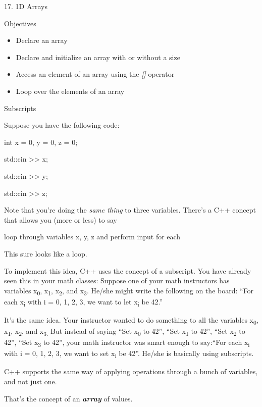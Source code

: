 \documentclass[
]{article}
\author{}
\date{}
\providecommand{\tightlist}{%
  \setlength{\itemsep}{0pt}\setlength{\parskip}{0pt}}
\begin{document}
17. 1D Arrays

Objectives

\begin{itemize}
\tightlist
\item
  Declare an array
\item
  Declare and initialize an array with or without a size
\item
  Access an element of an array using the \emph{{[}{]}} operator
\item
  Loop over the elements of an array
\end{itemize}

Subscripts

Suppose you have the following code:

int x = 0, y = 0, z = 0;

std::cin \textgreater\textgreater{} x;

std::cin \textgreater\textgreater{} y;

std::cin \textgreater\textgreater{} z;

Note that you're doing the \emph{same thing} to three variables. There's
a C++ concept that allows you (more or less) to say

loop through variables x, y, z and perform input for each

This sure looks like a loop.

To implement this idea, C++ uses the concept of a subscript. You have
already seen this in your math classes: Suppose one of your math
instructors has variables x\textsubscript{0}, x\textsubscript{1},
x\textsubscript{2}, and x\textsubscript{3}. He/she might write the
following on the board: ``For each x\textsubscript{i} with i = 0, 1, 2,
3, we want to let x\textsubscript{i }be 42.''

It's the same idea. Your instructor wanted to do something to all the
variables x\textsubscript{0}, x\textsubscript{1}, x\textsubscript{2},
and x\textsubscript{3. }But instead of saying ``Set x\textsubscript{0
}to 42'', ``Set x\textsubscript{1 }to 42'', ``Set x\textsubscript{2} to
42'', ``Set x\textsubscript{3 }to 42'', your math instructor was smart
enough to say:``For each x\textsubscript{i} with i = 0, 1, 2, 3, we want
to set x\textsubscript{i }be 42''. He/she is basically using subscripts.

C++ supports the same way of applying operations through a bunch of
variables, and not just one.

That's the concept of an \emph{\textbf{array}} of values.
\end{document}
